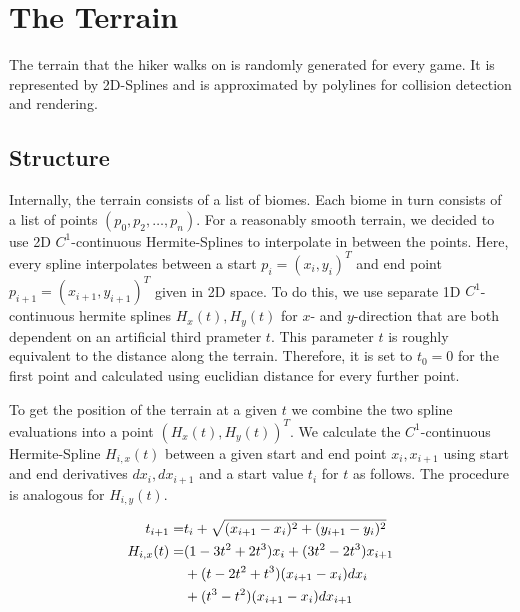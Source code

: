 \section{The Terrain}
The terrain that the hiker walks on is randomly generated for every game. It is represented by 2D-Splines and is approximated by polylines for collision detection and rendering.

\subsection{Structure}

Internally, the terrain consists of a list of biomes. 
Each biome in turn consists of a list of points $(p_0, p_2, \dots, p_n)$. 
For a reasonably smooth terrain, we decided to use 2D $C^1$-continuous Hermite-Splines to interpolate in between the points. 
Here, every spline interpolates between a start $p_i = (x_i, y_i)^T$ and end point $p_{i+1} = (x_{i+1}, y_{i+1})^T$ given in 2D space. 
To do this, we use separate 1D $C^1$-continuous hermite splines $H_x(t), H_y(t)$ for $x$- and $y$-direction that are both dependent on an artificial third prameter $t$.
This parameter $t$ is roughly equivalent to the distance along the terrain. 
Therefore, it is set to $t_0 = 0$ for the first point and calculated using euclidian distance for every further point.

To get the position of the terrain at a given $t$ we combine the two spline evaluations into a point $(H_x(t), H_y(t))^T$.
We calculate the $C^1$-continuous Hermite-Spline $H_{i,x}(t)$ between a given start and end point $x_{i}, x_{i+1}$ using start and end derivatives $dx_{i}, dx_{i+1}$ and a start value $t_i$ for $t$ as follows. The procedure is analogous for $H_{i,y}(t)$.

\begin{align}
  t_{i+1} = & t_{i} + \sqrt{(x_{i+1} - x_{i})^2 + (y_{i+1} - y_{i})^2} \\
  H_{i,x}(t) = & (1- 3t^2 + 2t^3)x_{i} + (3t^2 - 2t^3)x_{i+1} \notag\\
  & + (t-2t^2 + t^3)(x_{i+1}-x_{i})dx_{i} \notag\\
  & + (t^3 - t^2)(x_{i+1}-x_{i})dx_{i+1} 
\end{align}

